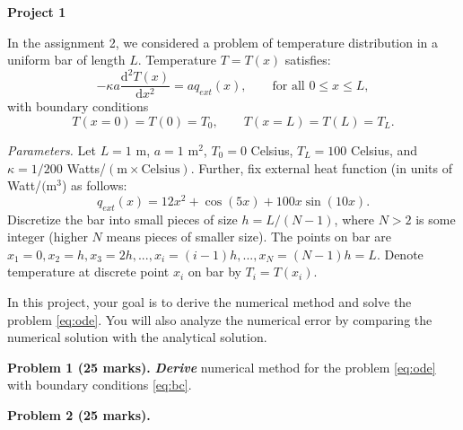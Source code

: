 \documentclass[11pt,a4paper]{report}
\newcommand{\dd}{\mathrm{d}}
\begin{document}
\begin{center} 
\textbf{\Large Project 1} 
\end{center}

In the assignment 2, we considered a problem of temperature distribution in a uniform bar of length $L$. Temperature $T = T(x)$ satisfies:
\begin{equation}\label{eq:ode}
-\kappa a \frac{\dd^2 T(x)}{\dd x^2} = a q_{ext}(x), \qquad \text{for all } 0 \leq x \leq L ,
\end{equation}
with boundary conditions 
\begin{equation}\label{eq:bc}
T(x=0) = T(0) = T_0, \qquad T(x=L) = T(L) = T_L .
\end{equation}

\vspace{10pt}
\noindent\textit{Parameters.} Let $L = 1$ m, $a = 1$ m$^2$, $T_0 = 0$ Celsius, $T_L = 100$ Celsius, and $\kappa = 1/200$ Watts/$(\text{m} \times \text{Celsius})$. Further, fix external heat function (in units of Watt/$(\text{m}^3$) as follows:
\begin{equation}\label{eq:qext}
q_{ext}(x) = 12x^2 + \cos(5x) + 100x \sin(10x).
\end{equation}
Discretize the bar into small pieces of size $h = L/(N-1)$, where $N>2$ is some integer (higher $N$ means pieces of smaller size). The points on bar are $x_1 = 0, x_2 = h, x_3 = 2h, ..., x_i = (i-1)h, ..., x_N = (N-1)h = L$. Denote temperature at discrete point $x_i$ on bar by $T_i = T(x_i)$.

In this project, your goal is to derive the numerical method and solve the problem \eqref{eq:ode}. You will also analyze the numerical error by comparing the numerical solution with the analytical solution. 

\vspace{10pt}
\noindent\textbf{Problem 1 (25 marks).} \textit{\textbf{Derive}} numerical method for the problem \eqref{eq:ode} with boundary conditions \eqref{eq:bc}.  

\vspace{10pt}
\noindent\textbf{Problem 2 (25 marks).} 
\end{document}
